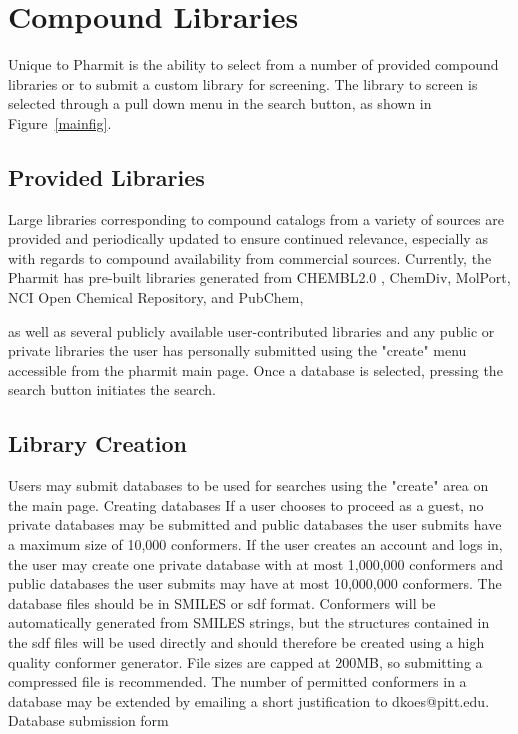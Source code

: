 \section{Compound Libraries}

Unique to Pharmit is the ability to select from a number of provided compound libraries or to submit a custom library for screening.  The library to screen is selected through a pull down menu in the search button, as shown in Figure~\ref{mainfig}.

\subsection{Provided Libraries}

Large libraries corresponding to compound catalogs from a variety of sources are provided and periodically updated to ensure continued relevance, especially as with regards to compound availability from commercial sources.  Currently, the Pharmit has pre-built libraries generated from CHEMBL2.0 \cite{Gaulton_2011}, ChemDiv, MolPort, NCI Open Chemical Repository, and PubChem, 
 
 
 as well as several publicly available user-contributed libraries and any public or private libraries the user has personally submitted using the "create" menu accessible from the pharmit main page. Once a database is selected, pressing the search button initiates the search. 

\subsection{Library Creation}
Users may submit databases to be used for searches using the "create" area on the main page. Creating databases
If a user chooses to proceed as a guest, no private databases may be submitted and public databases the user submits have a maximum size of 10,000 conformers. If the user creates an account and logs in, the user may create one private database with at most 1,000,000 conformers and public databases the user submits may have at most 10,000,000 conformers. The database files should be in SMILES or sdf format. Conformers will be automatically generated from SMILES strings, but the structures contained in the sdf files will be used directly and should therefore be created using a high quality conformer generator. File sizes are capped at 200MB, so submitting a compressed file is recommended. The number of permitted conformers in a database may be extended by emailing a short justification to dkoes@pitt.edu. 
Database submission form